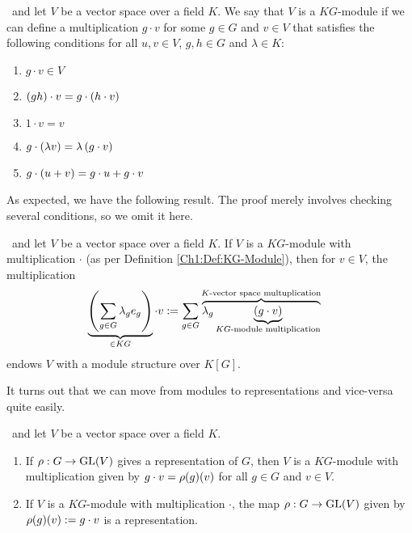 \begin{boxdefinition} \label{Ch1:Def:KG-Module}
    \ and let $V$ be a vector space over a field $K$. We say that $V$ is a $KG$-module if we can define a multiplication $g \cdot v$ for some $g \in G$ and $v \in V$ that satisfies the following conditions for all $u, v \in V$, $g, h \in G$ and $\lambda \in K$:
    \begin{enumerate}[noitemsep]
        \item $g \cdot v \in V$
        \item $\left( gh \right) \cdot v = g \cdot \left( h \cdot v \right)$
        \item $1 \cdot v = v$
        \item $g \cdot \left( \lambda v \right) = \lambda \left( g \cdot v \right)$
        \item $g \cdot \left( u + v \right) = g \cdot u + g \cdot v$
    \end{enumerate}
\end{boxdefinition}
As expected, we have the following result. The proof merely involves checking several conditions, so we omit it here.
\begin{proposition}
    \ and let $V$ be a vector space over a field $K$. If $V$ is a $KG$-module with multiplication $\cdot$ (as per Definition \ref{Ch1:Def:KG-Module}), then for $v \in V$, the multiplication
    \begin{align*}
       \underbrace{\left( \sum_{g \in G} \lambda_g e_g \right)}_{\in KG} \cdot v &:= \sum_{g \in G} \overbrace{\lambda_g \underbrace{\left( g \cdot v \right)}_{\text{$KG$-module multiplication}}}^{\text{$K$-vector space multuplication}}
    \end{align*}
    endows $V$ with a module structure over $K[G]$.
\end{proposition}

It turns out that we can move from modules to representations and vice-versa quite easily.

\begin{proposition}
    \ and let $V$ be a vector space over a field $K$.
    \begin{enumerate}[label = \normalfont \arabic*.]
        \item If $\rho : G \to \operatorname{GL}\!\left( V \right)$ gives a representation of $G$, then $V$ is a $KG$-module with multiplication given by $g \cdot v = \rho\!\left( g \right)\!\left( v \right)$ for all $g \in G$ and $v \in V$.
        \item If $V$ is a $KG$-module with multiplication $\cdot$, the map $\rho : G \to \operatorname{GL}\!\left( V \right)$ given by $\rho\!\left( g \right)\!\left( v \right) := g \cdot v$ is a representation.
    \end{enumerate}
\end{proposition}


